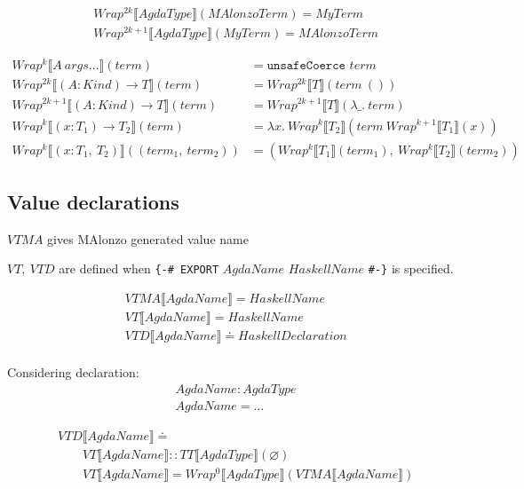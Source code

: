 \begin{align*}
   &Wrap^{2k}\llbracket AgdaType \rrbracket(MAlonzoTerm) = MyTerm\\
   &Wrap^{2k + 1}\llbracket AgdaType \rrbracket(MyTerm) = MAlonzoTerm
\end{align*}

\begin{align*}
   Wrap^k\llbracket A\ args\ldots \rrbracket(term) &= \texttt{unsafeCoerce } term\\
   Wrap^{2k}\llbracket (A : Kind) \rightarrow T \rrbracket(term) &= Wrap^{2k}\llbracket T \rrbracket(term\ ())\\
   Wrap^{2k+1}\llbracket (A : Kind) \rightarrow T \rrbracket(term) &= Wrap^{2k+1}\llbracket T \rrbracket(\lambda \_.\ term)\\
   Wrap^k\llbracket (x : T_1) \rightarrow T_2 \rrbracket(term) &=
      \lambda x.\ Wrap^k\llbracket T_2 \rrbracket(term\ Wrap^{k+1}\llbracket T_1 \rrbracket(x))\\
   Wrap^k\llbracket (x : T_1,\ T_2) \rrbracket((term_1,\ term_2)) &=
      (Wrap^k\llbracket T_1 \rrbracket(term_1),\ Wrap^k\llbracket T_2 \rrbracket(term_2))
\end{align*}

\subsection{Value declarations}

\(VTMA\) gives MAlonzo generated value name

\(VT,\ VTD\) are defined when \texttt{\{-\# EXPORT} \(AgdaName\) \(HaskellName\) \texttt{\#-\}} is specified.

\begin{align*}
   &VTMA\llbracket AgdaName \rrbracket = HaskellName\\
   &VT\llbracket AgdaName \rrbracket = HaskellName\\
   &VTD\llbracket AgdaName \rrbracket \doteq HaskellDeclaration\\
\end{align*}

Considering declaration:
\begin{align*}
   &AgdaName : AgdaType\\
   &AgdaName = \ldots
\end{align*}

\begin{align*}
   &VTD\llbracket AgdaName \rrbracket \doteq\\
   &\quad\quad VT\llbracket AgdaName \rrbracket :: TT\llbracket AgdaType \rrbracket(\varnothing)\\
   &\quad\quad VT\llbracket AgdaName \rrbracket = Wrap^0\llbracket AgdaType \rrbracket(VTMA\llbracket AgdaName \rrbracket)\\
\end{align*}

